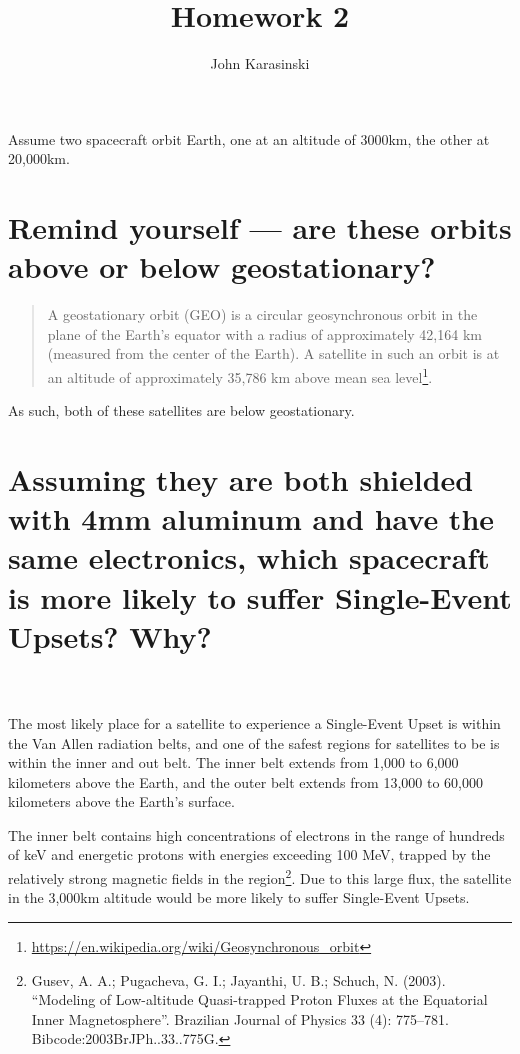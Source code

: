 \documentclass[onecolumn,10pt]{jhwhw}
\author{John Karasinski}
\title{Homework 2}
\begin{document}

Assume two spacecraft orbit Earth, one at an altitude of 3000km, the other at 20,000km.
\part{Remind yourself --- are these orbits above or below geostationary?}

\begin{quote}
A geostationary orbit (GEO) is a circular geosynchronous orbit in the plane of the Earth's equator with a radius of approximately 42,164 km (measured from the center of the Earth). A satellite in such an orbit is at an altitude of approximately 35,786 km above mean sea level\footnote{\url{https://en.wikipedia.org/wiki/Geosynchronous_orbit}}.
\end{quote}

\noindent As such, both of these satellites are below geostationary.

\part{Assuming they are both shielded with 4mm aluminum and have the same electronics, which spacecraft is more likely to suffer Single-Event Upsets? Why?}
\\
\\
\indent The most likely place for a satellite to experience a Single-Event Upset is within the Van Allen radiation belts, and one of the safest regions for satellites to be is within the inner and out belt. The inner belt extends from 1,000 to 6,000 kilometers above the Earth, and the outer belt extends from 13,000 to 60,000 kilometers above the Earth's surface.

The inner belt contains high concentrations of electrons in the range of hundreds of keV and energetic protons with energies exceeding 100 MeV, trapped by the relatively strong magnetic fields in the region\footnote{Gusev, A. A.; Pugacheva, G. I.; Jayanthi, U. B.; Schuch, N. (2003). ``Modeling of Low-altitude Quasi-trapped Proton Fluxes at the Equatorial Inner Magnetosphere''. Brazilian Journal of Physics 33 (4): 775–781. Bibcode:2003BrJPh..33..775G.}. Due to this large flux, the satellite in the 3,000km altitude would be more likely to suffer Single-Event Upsets.
\end{document}

